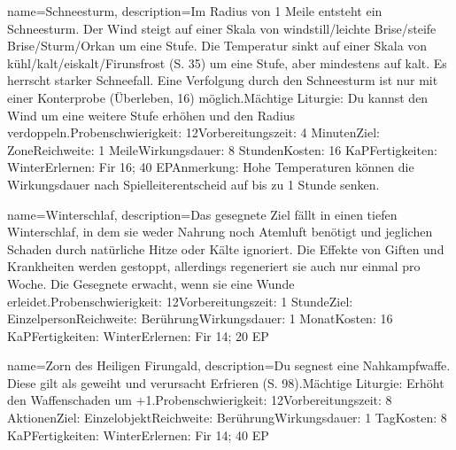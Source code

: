{
    name={Schneesturm},
    description={Im Radius von 1 Meile entsteht ein Schneesturm. Der Wind steigt auf einer Skala von windstill/leichte Brise/steife Brise/Sturm/Orkan um eine Stufe. Die Temperatur sinkt auf einer Skala von kühl/kalt/eiskalt/Firunsfrost (S. 35) um eine Stufe, aber mindestens auf kalt. Es herrscht starker Schneefall. Eine Verfolgung durch den Schneesturm ist nur mit einer Konterprobe (Überleben, 16) möglich.\newline Mächtige Liturgie: Du kannst den Wind um eine weitere Stufe erhöhen und den Radius verdoppeln.\newline Probenschwierigkeit: 12\newline Vorbereitungszeit: 4 Minuten\newline Ziel: Zone\newline Reichweite: 1 Meile\newline Wirkungsdauer: 8 Stunden\newline Kosten: 16 KaP\newline Fertigkeiten: Winter\newline Erlernen: Fir 16; 40 EP\newline Anmerkung: Hohe Temperaturen können die Wirkungsdauer nach Spielleiterentscheid auf bis zu 1 Stunde senken. }
}


{
    name={Winterschlaf},
    description={Das gesegnete Ziel fällt in einen tiefen Winterschlaf, in dem sie weder Nahrung noch Atemluft benötigt und jeglichen Schaden durch natürliche Hitze oder Kälte ignoriert. Die Effekte von Giften und Krankheiten werden gestoppt, allerdings regeneriert sie auch nur einmal pro Woche. Die Gesegnete erwacht, wenn sie eine Wunde erleidet.\newline Probenschwierigkeit: 12\newline Vorbereitungszeit: 1 Stunde\newline Ziel: Einzelperson\newline Reichweite: Berührung\newline Wirkungsdauer: 1 Monat\newline Kosten: 16 KaP\newline Fertigkeiten: Winter\newline Erlernen: Fir 14; 20 EP}
}


{
    name={Zorn des Heiligen Firungald},
    description={Du segnest eine Nahkampfwaffe. Diese gilt als geweiht und verursacht Erfrieren (S. 98).\newline Mächtige Liturgie: Erhöht den Waffenschaden um +1.\newline Probenschwierigkeit: 12\newline Vorbereitungszeit: 8 Aktionen\newline Ziel: Einzelobjekt\newline Reichweite: Berührung\newline Wirkungsdauer: 1 Tag\newline Kosten: 8 KaP\newline Fertigkeiten: Winter\newline Erlernen: Fir 14; 40 EP}
}


